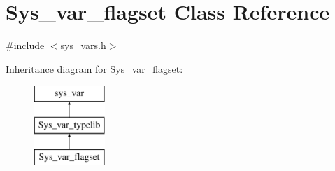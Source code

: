 \hypertarget{classSys__var__flagset}{}\section{Sys\+\_\+var\+\_\+flagset Class Reference}
\label{classSys__var__flagset}


{\ttfamily \#include $<$sys\+\_\+vars.\+h$>$}

Inheritance diagram for Sys\+\_\+var\+\_\+flagset\+:\begin{figure}[H]
\begin{center}
\leavevmode
\includegraphics[height=3.000000cm]{classSys__var__flagset}
\end{center}
\end{figure}
